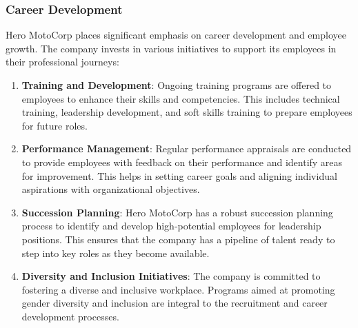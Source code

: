 \subsubsection{Career Development}
Hero MotoCorp places significant emphasis on career development and employee growth. The company invests in various initiatives to support its employees in their professional journeys:

\begin{enumerate}
	\item \textbf{Training and Development}: Ongoing training programs are offered to employees to enhance their skills and competencies. This includes technical training, leadership development, and soft skills training to prepare employees for future roles.
	
	\item \textbf{Performance Management}: Regular performance appraisals are conducted to provide employees with feedback on their performance and identify areas for improvement. This helps in setting career goals and aligning individual aspirations with organizational objectives.
	
	\item \textbf{Succession Planning}: Hero MotoCorp has a robust succession planning process to identify and develop high-potential employees for leadership positions. This ensures that the company has a pipeline of talent ready to step into key roles as they become available.
	
	\item \textbf{Diversity and Inclusion Initiatives}: The company is committed to fostering a diverse and inclusive workplace. Programs aimed at promoting gender diversity and inclusion are integral to the recruitment and career development processes.
\end{enumerate}